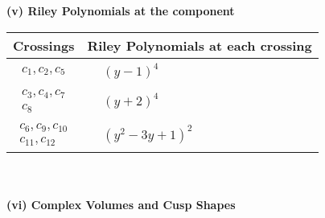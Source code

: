 \documentclass[1p]{elsarticle_modified}
\theoremstyle{definition}
\begin{document}
\newpage\renewcommand{\arraystretch}{1}
\flushleft \textbf{(v) Riley Polynomials at the component}\newline \\
\begin{tabular}{m{50pt}|m{274pt}}
Crossings & \hspace{64pt}Riley Polynomials at each crossing \\
\hline $$\begin{aligned}c_{1},c_{2},c_{5}\end{aligned}$$&$\begin{aligned}
&(y-1)^4
\end{aligned}$\\
\hline $$\begin{aligned}c_{3},c_{4},c_{7}\\c_{8}\end{aligned}$$&$\begin{aligned}
&(y+2)^4
\end{aligned}$\\
\hline $$\begin{aligned}c_{6},c_{9},c_{10}\\c_{11},c_{12}\end{aligned}$$&$\begin{aligned}
&(y^2-3 y+1)^2
\end{aligned}$\\
\hline
\end{tabular}\\~\\
\newpage\flushleft \textbf{(vi) Complex Volumes and Cusp Shapes}
\end{document}
